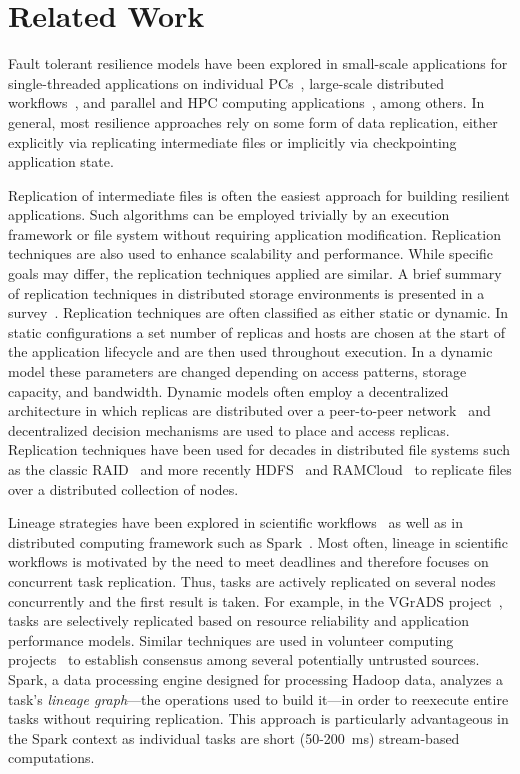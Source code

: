 \documentclass{sig-alternate}
\begin{document}
\section{Related Work}
\label{sec:Related}
Fault tolerant resilience models have been explored in small-scale applications for single-threaded applications on individual PCs~\cite{condor1988, libckpt1994}, large-scale distributed workflows~\cite{uncoordinated2010}, and parallel and HPC computing applications~\cite{mist1995, consistent1994,FTworkshop2009}, among others. In  general, most resilience approaches rely on some form of data replication, either explicitly via replicating intermediate files or implicitly via checkpointing application state.

Replication of intermediate files is often the easiest approach for building resilient applications. Such algorithms can be employed trivially by an execution framework or file system without requiring application modification. Replication techniques are also used to enhance scalability and performance. While specific goals may differ, the replication techniques applied are similar. A brief summary of replication techniques in distributed storage environments is presented in a survey~\cite{survey2012}. Replication techniques are often classified as either static or dynamic. In static configurations a set number of replicas and hosts are chosen at the start of the application lifecycle and are then used throughout execution. In a dynamic model these parameters are changed depending on access patterns, storage capacity, and bandwidth.  Dynamic models often employ a decentralized architecture in which replicas are distributed over a peer-to-peer network~\cite{chord} and decentralized decision mechanisms are used to place and access replicas. Replication techniques have been used for decades in distributed file systems such as the classic RAID~\cite{raid1988} and more recently HDFS~\cite{HDFS} and RAMCloud~\cite{ramcloud2010, ramcloud2014} to replicate files over a distributed collection of nodes.

Lineage strategies have been explored in scientific workflows~\cite{ramakrishnan09vgrads, calheiros13deadlines, Chimera2002} as well as in distributed computing framework such as Spark~\cite{RDD2012}. Most often, lineage in scientific workflows is motivated by the need to meet deadlines and therefore focuses on concurrent task replication. Thus, tasks are actively replicated on several nodes concurrently and the first result is taken. For example, in the VGrADS project~\cite{ramakrishnan09vgrads}, tasks are selectively replicated based on resource reliability and application performance models. Similar techniques are used in volunteer computing projects~\cite{boinc04} to establish consensus among several potentially untrusted sources. Spark, a data processing engine designed for processing Hadoop data, analyzes a task's \emph{lineage graph}---the operations used to build it---in order to reexecute entire tasks without requiring replication. This approach is particularly advantageous in the Spark context as individual tasks are short (50-200~ms) stream-based computations.
\end{document}
